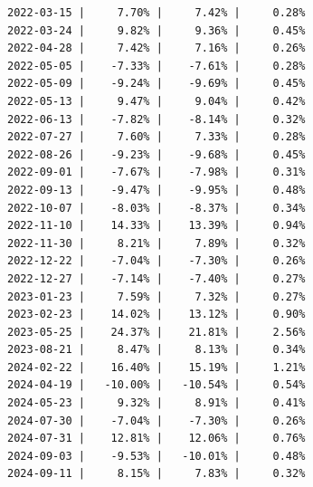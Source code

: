 \documentclass[a4paper, 12pt]{article}
\begin{document}
\begin{verbatim}
2022-03-15 |     7.70% |     7.42% |     0.28%
2022-03-24 |     9.82% |     9.36% |     0.45%
2022-04-28 |     7.42% |     7.16% |     0.26%
2022-05-05 |    -7.33% |    -7.61% |     0.28%
2022-05-09 |    -9.24% |    -9.69% |     0.45%
2022-05-13 |     9.47% |     9.04% |     0.42%
2022-06-13 |    -7.82% |    -8.14% |     0.32%
2022-07-27 |     7.60% |     7.33% |     0.28%
2022-08-26 |    -9.23% |    -9.68% |     0.45%
2022-09-01 |    -7.67% |    -7.98% |     0.31%
2022-09-13 |    -9.47% |    -9.95% |     0.48%
2022-10-07 |    -8.03% |    -8.37% |     0.34%
2022-11-10 |    14.33% |    13.39% |     0.94%
2022-11-30 |     8.21% |     7.89% |     0.32%
2022-12-22 |    -7.04% |    -7.30% |     0.26%
2022-12-27 |    -7.14% |    -7.40% |     0.27%
2023-01-23 |     7.59% |     7.32% |     0.27%
2023-02-23 |    14.02% |    13.12% |     0.90%
2023-05-25 |    24.37% |    21.81% |     2.56%
2023-08-21 |     8.47% |     8.13% |     0.34%
2024-02-22 |    16.40% |    15.19% |     1.21%
2024-04-19 |   -10.00% |   -10.54% |     0.54%
2024-05-23 |     9.32% |     8.91% |     0.41%
2024-07-30 |    -7.04% |    -7.30% |     0.26%
2024-07-31 |    12.81% |    12.06% |     0.76%
2024-09-03 |    -9.53% |   -10.01% |     0.48%
2024-09-11 |     8.15% |     7.83% |     0.32%
\end{verbatim}
\end{document}
